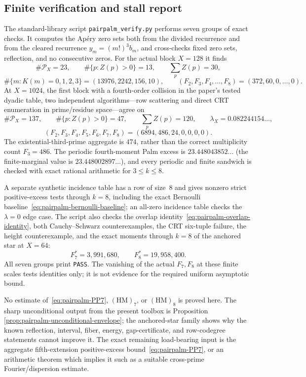 \subsection*{Finite verification and stall report}

The standard-library script \texttt{pairpalm\_verify.py} performs seven
groups of exact checks.  It computes the Ap\'ery zero sets both from the
divided recurrence and from the cleared recurrence $y_m=(m!)^3b_m$, and
cross-checks fixed zero sets, reflection, and no consecutive zeros.  For
the actual block $X=128$ it finds
\[
 \#\mathcal P_X=23,\qquad
 \#\{p:Z(p)>0\}=13,\qquad
 \sum_pZ(p)=30,
\]
\[
 \#\{m:K(m)=0,1,2,3\}=(13976,2242,156,10),
 \qquad
 (F_2,F_3,F_4,\ldots,F_8)=(372,60,0,\ldots,0).
\]
At $X=1024$, the first block with a fourth-order collision in the
paper's tested dyadic table, two independent algorithms---row scattering
and direct CRT enumeration in prime/residue space---agree on
\[
 \#\mathcal P_X=137,\qquad
 \#\{p:Z(p)>0\}=47,\qquad
 \sum_pZ(p)=120,\qquad \lambda_X=0.082244154\ldots,
\]
\[
 (F_2,F_3,F_4,F_5,F_6,F_7,F_8)
 =(6894,486,24,0,0,0,0).
\]
The existential-third-prime aggregate is $474$, rather than the correct
multiplicity count $F_3=486$.  The periodic fourth-moment Palm excess is
$23.448043852\ldots$ (the finite-marginal value is
$23.448002897\ldots$), and every periodic and finite sandwich is checked
with exact rational arithmetic for $3\leq k\leq8$.

A separate synthetic incidence table has a row of size~$8$ and gives
nonzero strict positive-excess tests through $k=8$, including the exact
Bernoulli baseline~\eqref{eq:pairpalm-bernoulli-baseline}; an all-zero
incidence table checks the $\lambda=0$ edge case.  The script also checks
the overlap identity~\eqref{eq:pairpalm-overlap-identity}, both
Cauchy--Schwarz counterexamples, the CRT six-tuple failure, the height
counterexample, and the exact moments through $k=8$ of the anchored star at
$X=64$:
\[
 F_7^*=3{,}991{,}680,
 \qquad F_8^*=19{,}958{,}400.
\]
All seven groups print \texttt{PASS}.  The vanishing of the actual
$F_7,F_8$ at these finite scales tests identities only; it is not evidence
for the required uniform asymptotic bound.

No estimate of~\eqref{eq:pairpalm-PP7}, $(\mathrm{HM})_7$, or
$(\mathrm{HM})_8$ is proved here.  The sharp unconditional output from
the present toolbox is Proposition
\ref{prop:pairpalm-unconditional-envelope}; the anchored-star family
shows why the known reflection, interval, fiber, energy, gap-certificate,
and row-codegree statements cannot improve it.  The exact remaining
load-bearing input is the aggregate fifth-extension positive-excess
bound~\eqref{eq:pairpalm-PP7}, or an arithmetic theorem which implies it
such as a suitable cross-prime Fourier/dispersion estimate.
